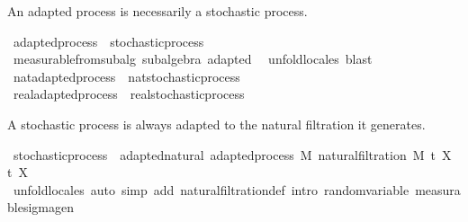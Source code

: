 \begin{isabellebody}
\begin{isamarkuptext}
An adapted process is necessarily a stochastic process.%
\end{isamarkuptext}\isamarkuptrue%
\isamarkupfalse%
\ adapted{\isacharunderscore}{\kern0pt}process\ {\isasymsubseteq}\ stochastic{\isacharunderscore}{\kern0pt}process%
\isadelimproof
\ %
\endisadelimproof
%
\isatagproof
{}\isamarkupfalse%
\ measurable{\isacharunderscore}{\kern0pt}from{\isacharunderscore}{\kern0pt}subalg\ subalgebra\ adapted\ \isamarkupfalse%
\ {\isacharparenleft}{\kern0pt}unfold{\isacharunderscore}{\kern0pt}locales{\isacharparenright}{\kern0pt}\ blast%
\endisatagproof
{\isafoldproof}%
%
\isadelimproof
%
\endisadelimproof
\isanewline
\isanewline
{}\isamarkupfalse%
\ nat{\isacharunderscore}{\kern0pt}adapted{\isacharunderscore}{\kern0pt}process\ {\isasymsubseteq}\ nat{\isacharunderscore}{\kern0pt}stochastic{\isacharunderscore}{\kern0pt}process%
\isadelimproof
\ %
\endisadelimproof
%
\isatagproof
\isacommand{{\isachardot}{\kern0pt}{\isachardot}{\kern0pt}}\isamarkupfalse%
%
\endisatagproof
{\isafoldproof}%
%
\isadelimproof
%
\endisadelimproof
\isanewline
{}\isamarkupfalse%
\ real{\isacharunderscore}{\kern0pt}adapted{\isacharunderscore}{\kern0pt}process\ {\isasymsubseteq}\ real{\isacharunderscore}{\kern0pt}stochastic{\isacharunderscore}{\kern0pt}process%
\isadelimproof
\ %
\endisadelimproof
%
\isatagproof
\isacommand{{\isachardot}{\kern0pt}{\isachardot}{\kern0pt}}\isamarkupfalse%
%
\endisatagproof
{\isafoldproof}%
%
\isadelimproof
%
\endisadelimproof
%
\begin{isamarkuptext}%
A stochastic process is always adapted to the natural filtration it generates.%
\end{isamarkuptext}\isamarkuptrue%
\isamarkupfalse%
\ stochastic{\isacharunderscore}{\kern0pt}process\ {\isasymsubseteq}\ adapted{\isacharunderscore}{\kern0pt}natural{\isacharcolon}{\kern0pt}\ adapted{\isacharunderscore}{\kern0pt}process\ M\ {\isachardoublequoteopen}natural{\isacharunderscore}{\kern0pt}filtration\ M\ t\ X{\isachardoublequoteclose}\ t\ X%
\isadelimproof
\ %
\endisadelimproof
%
\isatagproof
{}\isamarkupfalse%
\ {\isacharparenleft}{\kern0pt}unfold{\isacharunderscore}{\kern0pt}locales{\isacharparenright}{\kern0pt}\ {\isacharparenleft}{\kern0pt}auto\ simp\ add{\isacharcolon}{\kern0pt}\ natural{\isacharunderscore}{\kern0pt}filtration{\isacharunderscore}{\kern0pt}def\ intro{\isacharcolon}{\kern0pt}\ random{\isacharunderscore}{\kern0pt}variable\ measurable{\isacharunderscore}{\kern0pt}sigma{\isacharunderscore}{\kern0pt}gen{\isacharparenright}{\kern0pt}%

\end{isabellebody}
